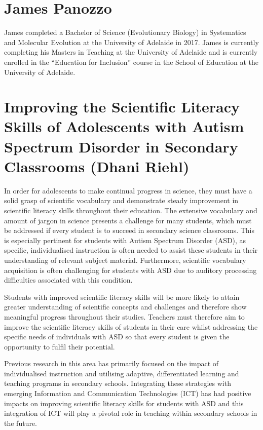 \documentclass[twoside,12pt,a4paper,notitlepage]{memoir}
\begin{document}
\section*{James Panozzo}

James completed a Bachelor of Science (Evolutionary Biology) in Systematics and Molecular Evolution at the University of Adelaide in 2017. James is currently completing his Masters in Teaching at the University of Adelaide and is currently enrolled in the “Education for Inclusion” course in the School of Education at the University of Adelaide.



\pagebreak
\section*{Improving the Scientific Literacy Skills of Adolescents with Autism Spectrum Disorder in Secondary Classrooms (Dhani Riehl)}
\label{aut:riehl}

In order for adolescents to make continual progress in science, they must have a solid grasp of scientific vocabulary and demonstrate steady improvement in scientific literacy skills throughout their education. The extensive vocabulary and amount of jargon in science presents a challenge for many students, which must be addressed if every student is to succeed in secondary science classrooms. This is especially pertinent for students with Autism Spectrum Disorder (ASD), as specific, individualised instruction is often needed to assist these students in their understanding of relevant subject material. Furthermore, scientific vocabulary acquisition is often challenging for students with ASD due to auditory processing difficulties associated with this condition.

Students with improved scientific literacy skills will be more likely to attain greater understanding of scientific concepts and challenges and therefore show meaningful progress throughout their studies. Teachers must therefore aim to improve the scientific literacy skills of students in their care whilst addressing the specific needs of individuals with ASD so that every student is given the opportunity to fulfil their potential.

Previous research in this area has primarily focused on the impact of individualised instruction and utilising adaptive, differentiated learning and teaching programs in secondary schools. Integrating these strategies with emerging Information and Communication Technologies (ICT) has had positive impacts on improving scientific literacy skills for students with ASD and this integration of ICT will play a pivotal role in teaching within secondary schools in the future.
\end{document}
